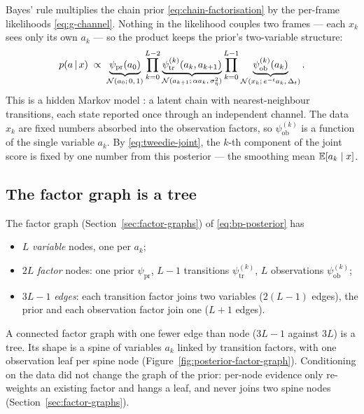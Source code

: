 Bayes' rule multiplies the chain prior \eqref{eq:chain-factorisation} by the
per-frame likelihoods \eqref{eq:g-channel}. Nothing in the likelihood couples
two frames --- each $x_k$ sees only its own $a_k$ --- so the product keeps the
prior's two-variable structure:
\begin{equation}
  p(a \,|\, x) \;\propto\;
  \underbrace{\psi_{\mathrm{pr}}(a_0)}_{\mathcal{N}(a_0;\,0,\,1)}
  \prod_{k=0}^{L-2}
  \underbrace{\psi^{(k)}_{\mathrm{tr}}(a_k, a_{k+1})}
            _{\mathcal{N}(a_{k+1};\,\alpha a_k,\,\sigma_\eta^2)}
  \prod_{k=0}^{L-1}
  \underbrace{\psi^{(k)}_{\mathrm{ob}}(a_k)}
            _{\mathcal{N}(x_k;\,e^{-t}a_k,\,\Delta_t)} .
  \label{eq:bp-posterior}
\end{equation}
This is a hidden Markov model \citep{rabiner1989tutorial}: a latent chain with
nearest-neighbour transitions, each state reported once through an independent
channel. The data $x_k$ are fixed numbers absorbed into the observation
factors, so $\psi^{(k)}_{\mathrm{ob}}$ is a function of the single variable
$a_k$. By \eqref{eq:tweedie-joint}, the $k$-th component of the joint score is
fixed by one number from this posterior --- the smoothing mean
$\mathbb{E}[a_k \mid x]$.

\subsection{The factor graph is a tree}

The factor graph (Section~\ref{sec:factor-graphs}) of
\eqref{eq:bp-posterior} has
\begin{itemize}
\item $L$ \emph{variable} nodes, one per $a_k$;
\item $2L$ \emph{factor} nodes: one prior $\psi_{\mathrm{pr}}$, $L-1$
  transitions $\psi^{(k)}_{\mathrm{tr}}$, $L$ observations
  $\psi^{(k)}_{\mathrm{ob}}$;
\item $3L - 1$ \emph{edges}: each transition factor joins two variables
  ($2(L-1)$ edges), the prior and each observation factor join one
  ($L + 1$ edges).
\end{itemize}
A connected factor graph with one fewer edge than node ($3L-1$ against $3L$) is
a tree. Its shape is a spine of variables $a_k$ linked by transition factors,
with one observation leaf per spine node
(Figure~\ref{fig:posterior-factor-graph}). Conditioning on the data did not
change the graph of the prior: per-node evidence only re-weights an existing
factor and hangs a leaf, and never joins two spine nodes
(Section~\ref{sec:factor-graphs}).

